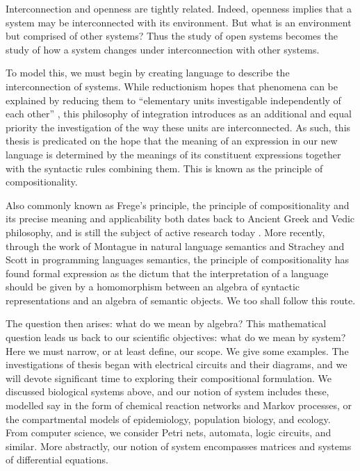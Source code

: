 Interconnection and openness are tightly related. Indeed, openness implies that
a system may be interconnected with its environment. But what is an environment
but comprised of other systems? Thus the study of open systems becomes the study
of how a system changes under interconnection with other systems.

To model this, we must begin by creating language to describe the
interconnection of systems. While reductionism hopes that phenomena can be
explained by reducing them to ``elementary units investigable independently of
each other'' \cite{Ber68}, this philosophy of integration introduces as an
additional and equal priority the investigation of the way these units are
interconnected. As such, this thesis is predicated on the hope that the meaning
of an expression in our new language is determined by the meanings of its
constituent expressions together with the syntactic rules combining them. This
is known as the principle of compositionality. 

Also commonly known as Frege's principle, the principle of compositionality and
its precise meaning and applicability both dates back to Ancient Greek and Vedic
philosophy, and is still the subject of active research today
\cite{Jan86,Sza13}. More recently, through the work of Montague \cite{Mon70} in
natural language semantics and Strachey and Scott \cite{SS71} in programming
languages semantics, the principle of compositionality has found formal
expression as the dictum that the interpretation of a language should be given
by a homomorphism between an algebra of syntactic representations and an algebra
of semantic objects. We too shall follow this route.

The question then arises: what do we mean by algebra? This mathematical question
leads us back to our scientific objectives: what do we mean by system? Here we
must narrow, or at least define, our scope. We give some examples. The
investigations of thesis began with electrical circuits and their diagrams, and
we will devote significant time to exploring their compositional formulation. We
discussed biological systems above, and our notion of system includes these,
modelled say in the form of chemical reaction networks and Markov processes, or
the compartmental models of epidemiology, population biology, and ecology. From
computer science, we consider Petri nets, automata, logic circuits, and similar.
More abstractly, our notion of system encompasses matrices and systems of
differential equations. 

